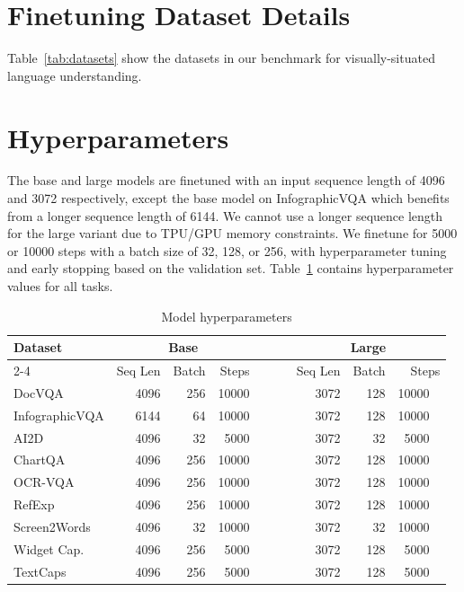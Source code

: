 \documentclass{article} %
\begin{document}
\pagebreak
\section{Finetuning Dataset Details}
\label{sec:finetuning_datasets}
Table~\ref{tab:datasets} show the datasets in our benchmark for visually-situated language understanding.


\clearpage
\section{Hyperparameters}
\label{sec:hyperparams}
The base and large models are finetuned with an input sequence length of 4096 and 3072 respectively, except the base model on InfographicVQA which benefits from a longer sequence length of 6144. We cannot use a longer sequence length for the large variant due to TPU/GPU memory constraints. 
We finetune for 5000 or 10000 steps with a batch size of 32, 128, or 256, with hyperparameter tuning and early stopping based on the validation set. Table~\ref{tab:hyperparams} contains hyperparameter values for all tasks.

\begin{table}[t]
\centering
\begin{tabular}{ l r r r c r r r} 
\toprule
\multirow{3}{*}{Dataset} & \multicolumn{3}{c}{Base} &~~~& \multicolumn{3}{c}{Large}\\
\cmidrule{2-4}\cmidrule{6-8}
& Seq Len & Batch & Steps & & Seq Len & Batch & Steps \\
\midrule
DocVQA & 4096 & 256 & 10000 & & 3072 & 128 & 10000 ~\\
InfographicVQA & 6144 & 64 & 10000 & & 3072 & 128 & 10000 ~\\
AI2D & 4096 & 32 & 5000 & & 3072 & 32 & 5000 ~\\
ChartQA & 4096 & 256 & 10000 & & 3072 & 128 & 10000 ~\\
OCR-VQA & 4096 & 256 & 10000 & & 3072 & 128 & 10000 ~\\
RefExp & 4096 & 256 & 10000 & & 3072 & 128 & 10000 ~\\
Screen2Words & 4096 & 32 & 10000 & & 3072 & 32 & 10000 ~\\
Widget Cap. & 4096 & 256 & 5000 & & 3072 & 128 & 5000 ~\\
TextCaps & 4096 & 256 & 5000 & & 3072 & 128 & 5000 ~\\
\bottomrule
\end{tabular}
\caption{Model hyperparameters}
\label{tab:hyperparams}
\end{table}
\end{document}
